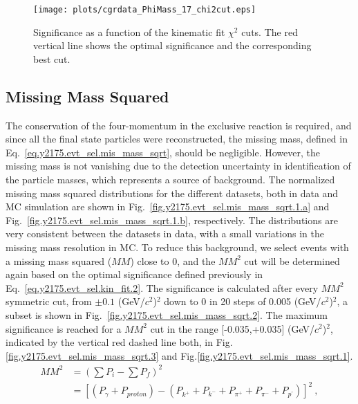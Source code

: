 \begin{figure}[H]
    \centering
        \texttt{[image: plots/cgrdata\_PhiMass\_17\_chi2cut.eps]}
        \caption{Significance as a function of the kinematic fit $\chi^{2}$ cuts. The red vertical line shows the optimal significance and the corresponding best cut.}
        \label{fig.y2175.evt_sel.kin_fit.3}
\end{figure}

\subsection{Missing Mass Squared}
\label{chap.y2175.evt_sel.mis_mass_sqrt}

The conservation of the four-momentum in the exclusive reaction is required, and since all the final state particles were reconstructed, the missing mass, defined in Eq.~\ref{eq.y2175.evt_sel.mis_mass_sqrt}, should be negligible. However, the missing mass is not vanishing due to the detection uncertainty in identification of the particle masses, which represents a source of background. The normalized missing mass squared distributions for the different datasets, both in data and MC simulation are shown in Fig.~\ref{fig.y2175.evt_sel.mis_mass_sqrt.1.a} and Fig.~\ref{fig.y2175.evt_sel.mis_mass_sqrt.1.b}, respectively. The distributions are very consistent between the datasets in data, with a small variations in the missing mass resolution in MC. To reduce this background, we select events with a missing mass squared ($MM$) close to 0, and the $MM^{2}$ cut will be determined again based on the optimal significance defined previously in Eq.~\ref{eq.y2175.evt_sel.kin_fit.2}. The significance is calculated after every $MM^{2}$ symmetric cut, from $\pm 0.1$ (GeV/$c^2$)$^2$ down to 0 in 20 steps of 0.005 (GeV/$c^2$)$^2$, a subset is shown in Fig.~\ref{fig.y2175.evt_sel.mis_mass_sqrt.2}. The maximum significance is reached for a $MM^{2}$ cut in the range [-0.035,+0.035] (GeV/$c^2$)$^2$, indicated by the vertical red dashed line both, in Fig.\ref{fig.y2175.evt_sel.mis_mass_sqrt.3} and Fig.\ref{fig.y2175.evt_sel.mis_mass_sqrt.1}.
\begin{equation}
    \label{eq.y2175.evt_sel.mis_mass_sqrt}
    \begin{aligned}
        MM^2 &= \left(\sum P_{i} - \sum P_{f}\right)^2 \\
             &= [(P_{\gamma} + P_{proton}) - (P_{k^+} + P_{k^-} + P_{\pi^+} + P_{\pi^-} + P_{p^{\prime}})]^2~,
    \end{aligned}    
\end{equation}

